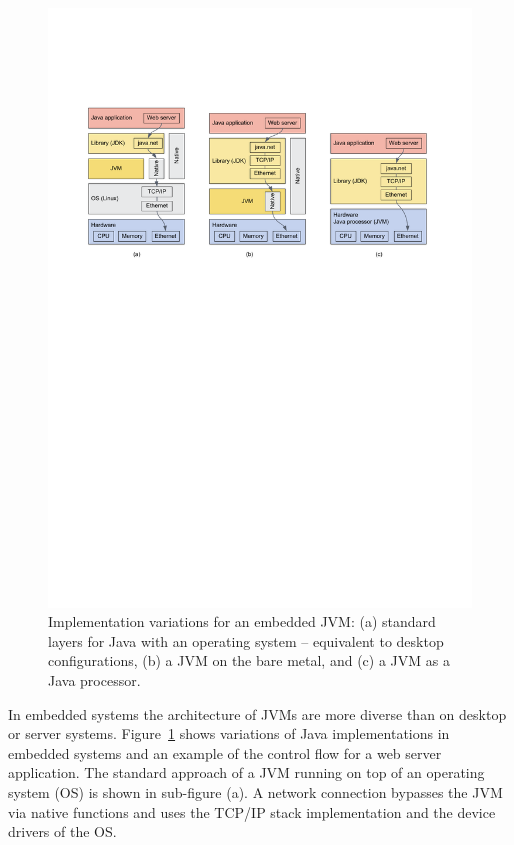 \begin{figure}
    \centering
    \includegraphics[width=\textwidth]{intro/jvmall}
    \caption{Implementation variations for an embedded JVM: (a) standard layers
    for Java with an operating system -- equivalent to desktop configurations, (b) a JVM on the bare metal,
    and (c) a JVM as a Java processor.}\label{fig:java:embedded}
\end{figure}

In embedded systems the architecture of JVMs are more diverse than
on desktop or server systems. Figure~\ref{fig:java:embedded} shows
variations of Java implementations in embedded systems and an
example of the control flow for a web server application. The
standard approach of a JVM running on top of an operating system
(OS) is shown in sub-figure (a). A network connection bypasses the
JVM via native functions and uses the TCP/IP stack implementation
and the device drivers of the OS.

